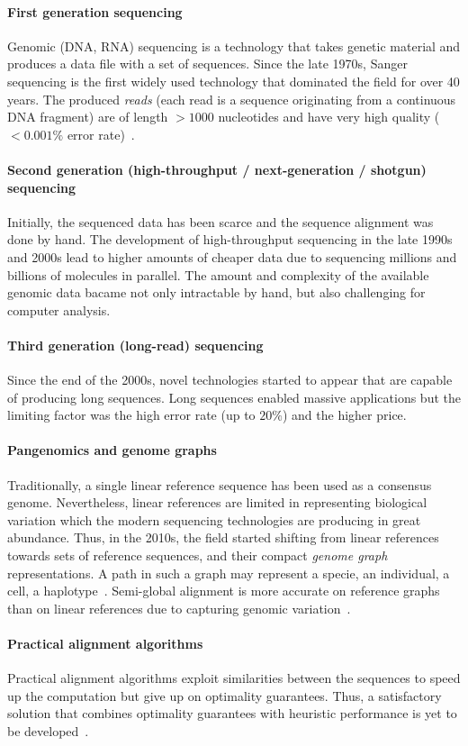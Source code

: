 \paragraph{First generation sequencing}
Genomic (DNA, RNA) sequencing is a technology that takes genetic material and
produces a data file with a set of sequences. Since the late 1970s, Sanger
sequencing is the first widely used technology that dominated the field for over
40 years. The produced \emph{reads} (each read is a sequence originating from a
continuous DNA fragment) are of length ${>}1000$ nucleotides and have very high
quality (${<}0.001\%$ error rate)~\citep{shendure2008next}.

\paragraph{Second generation (high-throughput / next-generation / shotgun) sequencing}
Initially, the sequenced data has been scarce and the sequence alignment was
done by hand. The development of high-throughput sequencing in the late 1990s
and 2000s lead to higher amounts of cheaper data due to sequencing millions and
billions of molecules in parallel. The amount and complexity of the available
genomic data bacame not only intractable by hand, but also challenging for
computer analysis.

\paragraph{Third generation (long-read) sequencing}
Since the end of the 2000s, novel technologies started to appear that are
capable of producing long sequences. Long sequences enabled massive applications
but the limiting factor was the high error rate (up to $20\%$) and the higher
price.

\paragraph{Pangenomics and genome graphs}
Traditionally, a single linear reference sequence has been used as a consensus
genome. Nevertheless, linear references are limited in representing biological
variation which the modern sequencing technologies are producing in great
abundance. Thus, in the 2010s, the field started shifting from linear references
towards sets of reference sequences, and their compact \emph{genome graph}
representations. A path in such a graph may represent a specie, an individual, a
cell, a haplotype~\cite{dilthey_improved_2015,paten_genome_2017}. Semi-global
alignment is more accurate on reference graphs than on linear references due to
capturing genomic variation~\citep{garrison_variation_2018}.

\paragraph{Practical alignment algorithms}
Practical alignment algorithms exploit similarities between the sequences to
speed up the computation but give up on optimality guarantees. Thus, a
satisfactory solution that combines optimality guarantees with heuristic
performance is yet to be developed~\citep{medvedev2022theoretical}.
